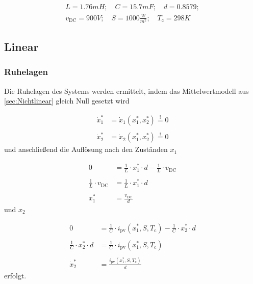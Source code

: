 \begin{align*}
    L = 1.76mH;\quad C = 15.7mF;\quad d = 0.8579; \\
    v_{\mathrm{DC}} = 900V;\quad S = 1000\frac{W}{m^2};\quad T_{\mathrm{c}} = 298K
\end{align*}

\subsection{Linear} \label{sec:Linear}

\subsubsection{Ruhelagen} \label{sec:Ruhelagen}

Die Ruhelagen des Systems werden ermittelt, indem das Mittelwertmodell aus \autoref{sec:Nichtlinear} gleich Null gesetzt wird

\begin{align*}
    \dot{x}_{\mathrm{1}}^* &= \dot{x}_{\mathrm{1}}(x_{\mathrm{1}}^*, x_{\mathrm{2}}^*) \overset{!}{=} 0 \\\\
    \dot{x}_{\mathrm{2}}^* &= \dot{x}_{\mathrm{2}}(x_{\mathrm{1}}^*, x_{\mathrm{2}}^*) \overset{!}{=} 0
\end{align*}
\newline
und anschließend die Auflösung nach den Zuständen $x_{\mathrm{1}}$

\begin{align}
    0 &= \frac{1}{L}\cdot x_{\mathrm{1}}^*\cdot d-\frac{1}{L}\cdot v_{\mathrm{DC}} \nonumber \\ \nonumber \\
    \frac{1}{L}\cdot v_{\mathrm{DC}} &= \frac{1}{L}\cdot x_{\mathrm{1}}^*\cdot d \nonumber \\ \nonumber \\
    x_{\mathrm{1}}^* &= \frac{v_{\mathrm{DC}}}{d}
    \label{eq:Gleichung10}
\end{align}
\newline
und $x_{\mathrm{2}}$

\begin{align}
    0 &= \frac{1}{C}\cdot i_{\mathrm{pv}}(x_{\mathrm{1}}^*, S, T_{\mathrm{c}})-\frac{1}{C}\cdot x_{\mathrm{2}}^*\cdot d \nonumber \\ \nonumber \\
    \frac{1}{C}\cdot x_{\mathrm{2}}^*\cdot d &= \frac{1}{C}\cdot i_{\mathrm{pv}}(x_{\mathrm{1}}^*, S, T_{\mathrm{c}}) \nonumber \\ \nonumber \\
    \dot{x}_{\mathrm{2}}^* &= \frac{i_{\mathrm{pv}}(x_{\mathrm{1}}^*, S, T_{\mathrm{c}})}{d}
    \label{eq:Gleichung11}
\end{align}
\newline
erfolgt.\\

